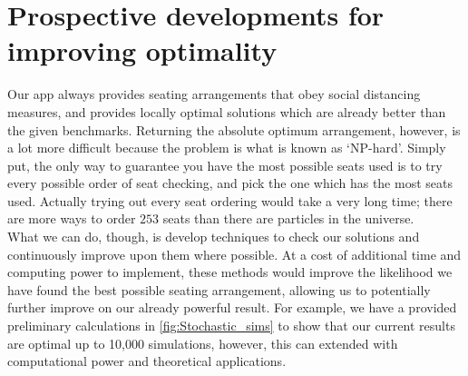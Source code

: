 \documentclass[11pt,a4paper]{article}
\begin{document}
\section*{Prospective developments for improving optimality}
Our app always provides seating arrangements that obey social distancing measures, and provides locally optimal solutions which are already better than the given benchmarks. Returning the  absolute optimum arrangement, however, is a lot more difficult because the problem is what is known as `NP-hard'.  Simply put, the only way to guarantee you have the most possible seats used is to try every possible order of seat checking, and pick the one which has the most seats used. Actually trying out every seat ordering would take a very long time; there are more ways to order $253$ seats than there are particles in the universe.\\

What we can do, though, is develop techniques to check our solutions and continuously improve upon them where possible. At a cost of additional time and computing power to implement, these methods would improve the likelihood we have found the best possible seating arrangement, allowing us to potentially further improve on our already powerful result. For example, we have a provided preliminary calculations in \autoref{fig:Stochastic_sims} to show that our current results are optimal up to 10,000 simulations, however, this can extended with computational power and theoretical applications.\\
\end{document}
